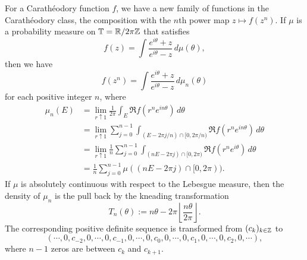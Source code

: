 \documentclass[a4paper]{article}
\begin{document}
\begin{ex}
For a Carath\'eodory function $f$, we have a new family of functions in the Carath\'eodory class, the composition with the $n$th power map $z\mapsto f(z^n)$.
If $\mu$ is a probability measure on $\mathbb{T}=\mathbb{R}/2\pi\mathbb{Z}$ that satisfies
\[f(z)=\int\frac{e^{i\theta}+z}{e^{i\theta}-z}\,d\mu(\theta),\]
then we have 
\[f(z^n)=\int\frac{e^{i\theta}+z}{e^{i\theta}-z}\,d\mu_n(\theta)\]
for each positive integer $n$, where
\begin{align*}
\mu_n(E)&=\lim_{r\uparrow1}\frac1{2\pi}\int_E\Re f(r^ne^{in\theta})\,d\theta\\
&=\lim_{r\uparrow1}\sum_{j=0}^{n-1}\int_{(E-2\pi j/n)\cap[0,2\pi/n)}\Re f(r^ne^{in\theta})\,d\theta\\
&=\lim_{r\uparrow1}\frac1n\sum_{j=0}^{n-1}\int_{(nE-2\pi j)\cap[0,2\pi)}\Re f(r^ne^{i\theta})\,d\theta\\
&=\frac1n\sum_{j=0}^{n-1}\mu((nE-2\pi j)\cap[0,2\pi)).
\end{align*}
If $\mu$ is absolutely continuous with respect to the Lebesgue measure, then the density of $\mu_n$ is the pull back by the kneading transformation
\[T_n(\theta):=n\theta-2\pi\left\lfloor\frac{n\theta}{2\pi}\right\rfloor.\]
The corresponding positive definite sequence is transformed from $(c_k)_{k\in\mathbb{Z}}$ to
\[(\cdots,0,c_{-2},0,\cdots,0,c_{-1},0,\cdots,0,c_0,0,\cdots,0,c_1,0,\cdots,0,c_2,0,\cdots),\]
where $n-1$ zeros are between $c_k$ and $c_{k+1}$.
\end{ex}
\end{document}
